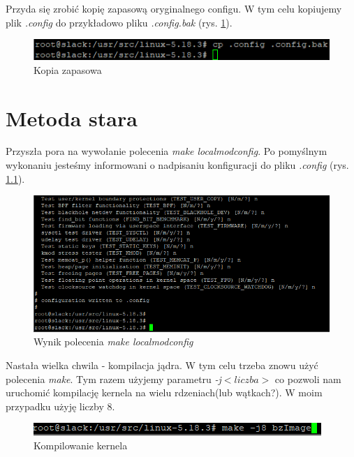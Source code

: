 \documentclass[a4paper,12pt,oneside]{book} %
\begin{document}
Przyda się zrobić kopię zapasową oryginalnego configu. W tym celu kopiujemy plik \emph{.config} do przykładowo pliku \emph{.config.bak} (rys. \ref{config-bak}).
\begin{figure}[h]
	\centering
	\includegraphics[scale=0.6]{05-config-bak}
	\caption{Kopia zapasowa}
	\label{config-bak}
\end{figure}

\chapter{Metoda stara}
\label{Metoda stara}

Przyszła pora na wywołanie polecenia \emph{make localmodconfig}. Po pomyślnym wykonaniu jesteśmy informowani o nadpisaniu konfiguracji do pliku \emph{.config} (rys. \ref{old-config}).

\begin{figure}[h]
	\centering
	\includegraphics[scale=0.6]{06-old-config}
	\caption{Wynik polecenia \emph{make localmodconfig}}
	\label{old-config}
\end{figure}

Nastała wielka chwila - kompilacja jądra. W tym celu trzeba znowu użyć polecenia \emph{make}. Tym razem użyjemy parametru \emph{-j$<liczba>$} co pozwoli nam uruchomić kompilację kernela na wielu rdzeniach(lub wątkach?). W moim przypadku użyję liczby 8. 

\begin{figure}[h]
	\centering
	\includegraphics[scale=0.6]{08-bzimage}
	\caption{Kompilowanie kernela}
	\label{bzimage}
\end{figure}

\pagebreak
\end{document}
